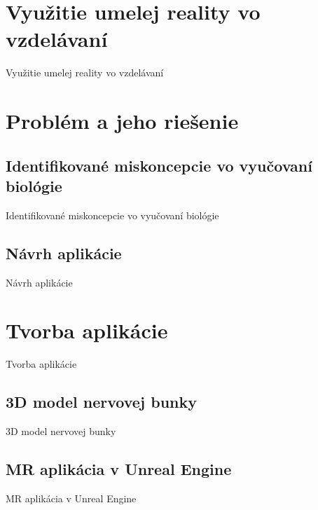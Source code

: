 \documentclass[pdf]{beamer}
\begin{document}
\section{Využitie umelej reality vo vzdelávaní}
\begin{frame}{Využitie umelej reality vo vzdelávaní}
    
\end{frame}

\section{Problém a jeho riešenie}
\subsection{Identifikované miskoncepcie vo vyučovaní biológie}
\begin{frame}{Identifikované miskoncepcie vo vyučovaní biológie}
    
\end{frame}

\subsection{Návrh aplikácie}
\begin{frame}{Návrh aplikácie}
    
\end{frame}

\section{Tvorba aplikácie}
\begin{frame}{Tvorba aplikácie}
    
\end{frame}

\subsection{3D model nervovej bunky}
\begin{frame}{3D model nervovej bunky}
    
\end{frame}

\subsection{MR aplikácia v Unreal Engine}
\begin{frame}{MR aplikácia v Unreal Engine}
    
\end{frame}
\end{document}
